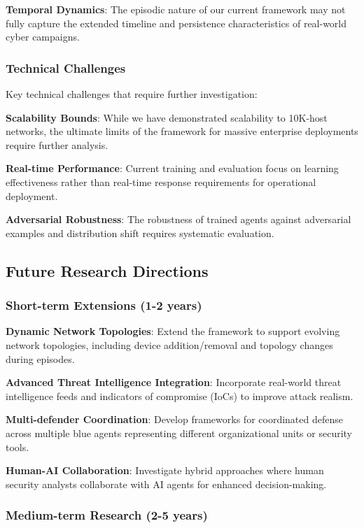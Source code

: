 \documentclass[11pt]{article}
\theoremstyle{definition}
\theoremstyle{plain}
\begin{document}
\textbf{Temporal Dynamics}: The episodic nature of our current framework may not fully capture the extended timeline and persistence characteristics of real-world cyber campaigns.

\subsubsection{Technical Challenges}
Key technical challenges that require further investigation:

\textbf{Scalability Bounds}: While we have demonstrated scalability to 10K-host networks, the ultimate limits of the framework for massive enterprise deployments require further analysis.

\textbf{Real-time Performance}: Current training and evaluation focus on learning effectiveness rather than real-time response requirements for operational deployment.

\textbf{Adversarial Robustness}: The robustness of trained agents against adversarial examples and distribution shift requires systematic evaluation.

\subsection{Future Research Directions}

\subsubsection{Short-term Extensions (1-2 years)}

\textbf{Dynamic Network Topologies}: Extend the framework to support evolving network topologies, including device addition/removal and topology changes during episodes.

\textbf{Advanced Threat Intelligence Integration}: Incorporate real-world threat intelligence feeds and indicators of compromise (IoCs) to improve attack realism.

\textbf{Multi-defender Coordination}: Develop frameworks for coordinated defense across multiple blue agents representing different organizational units or security tools.

\textbf{Human-AI Collaboration}: Investigate hybrid approaches where human security analysts collaborate with AI agents for enhanced decision-making.

\subsubsection{Medium-term Research (2-5 years)}
\end{document}
